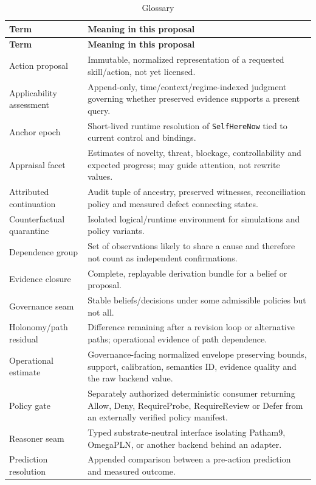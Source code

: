 \documentclass[11pt,oneside]{report}
\newcommand{\SelfHereNow}{\texttt{SelfHereNow}}
\begin{document}
\begin{longtable}{@{}L{1.65in}L{4.90in}@{}}
\caption{Glossary}\label{tab:glossary}\\
\toprule
\textbf{Term} & \textbf{Meaning in this proposal} \\
\midrule
\endfirsthead
\toprule
\textbf{Term} & \textbf{Meaning in this proposal} \\
\midrule
\endhead
Action proposal & Immutable, normalized representation of a requested skill/action, not yet licensed. \\
Applicability assessment & Append-only, time/context/regime-indexed judgment governing whether preserved evidence supports a present query. \\
Anchor epoch & Short-lived runtime resolution of \SelfHereNow{} tied to current control and bindings. \\
Appraisal facet & Estimates of novelty, threat, blockage, controllability and expected progress; may guide attention, not rewrite values. \\
Attributed continuation & Audit tuple of ancestry, preserved witnesses, reconciliation policy and measured defect connecting states. \\
Counterfactual quarantine & Isolated logical/runtime environment for simulations and policy variants. \\
Dependence group & Set of observations likely to share a cause and therefore not count as independent confirmations. \\
Evidence closure & Complete, replayable derivation bundle for a belief or proposal. \\
Governance seam & Stable beliefs/decisions under some admissible policies but not all. \\
Holonomy/path residual & Difference remaining after a revision loop or alternative paths; operational evidence of path dependence. \\
Operational estimate & Governance-facing normalized envelope preserving bounds, support, calibration, semantics ID, evidence quality and the raw backend value. \\
Policy gate & Separately authorized deterministic consumer returning Allow, Deny, RequireProbe, RequireReview or Defer from an externally verified policy manifest. \\
Reasoner seam & Typed substrate-neutral interface isolating Patham9, OmegaPLN, or another backend behind an adapter. \\
Prediction resolution & Appended comparison between a pre-action prediction and measured outcome. \\

\end{longtable}
\end{document}
